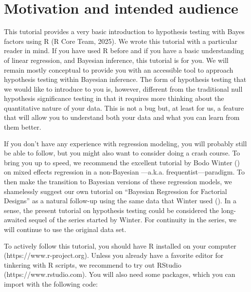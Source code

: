 \documentclass[
  doc,
  floatsintext,
  longtable,
  nolmodern,
  notxfonts,
  notimes,
  colorlinks=true,linkcolor=blue,citecolor=blue,urlcolor=blue]{apa7}
\begin{document}
\section{Motivation and intended
audience}\label{motivation-and-intended-audience}

This tutorial provides a very basic introduction to hypothesis testing
with Bayes factors using R (R Core Team, 2025). We wrote this tutorial
with a particular reader in mind. If you have used R before and if you
have a basic understanding of linear regression, and Bayesian inference,
this tutorial is for you. We will remain mostly conceptual to provide
you with an accessible tool to approach hypothesis testing within
Bayesian inference. The form of hypothesis testing that we would like to
introduce to you is, however, different from the traditional null
hypothesis significance testing in that it requires more thinking about
the quantitative nature of your data. This is not a bug but, at least
for us, a feature that will allow you to understand both your data and
what you can learn from them better.

If you don't have any experience with regression modeling, you will
probably still be able to follow, but you might also want to consider
doing a crash course. To bring you up to speed, we recommend the
excellent tutorial by Bodo Winter
() on mixed eﬀects
regression in a non-Bayesian ---a.k.a. frequentist---paradigm. To then
make the transition to Bayesian versions of these regression models, we
shamelessly suggest our own tutorial on ``Bayesian Regression for
Factorial Designs'' as a natural follow-up using the same data that
Winter used
(). In a sense, the present tutorial on hypothesis testing
could be considered the long-awaited sequel of the series started by
Winter. For continuity in the series, we will continue to use the
original data set.

To actively follow this tutorial, you should have R installed on your
computer (https://www.r-project.org). Unless you already have a favorite
editor for tinkering with R scripts, we recommend to try out RStudio
(https://www.rstudio.com). You will also need some packages, which you
can import with the following code:
\end{document}
